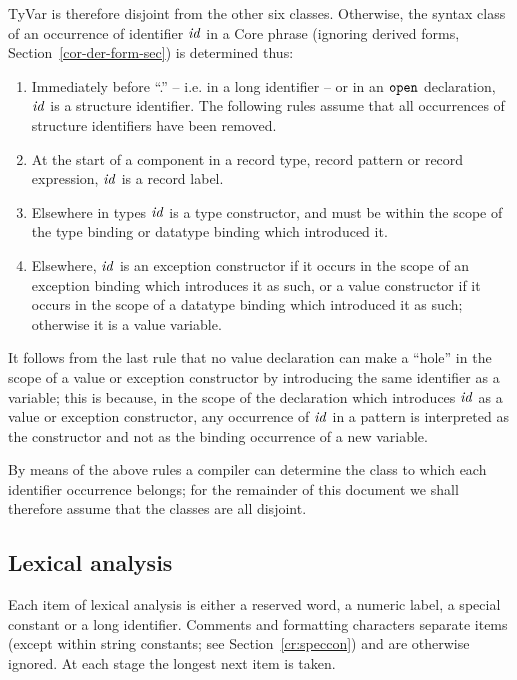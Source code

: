 TyVar is therefore disjoint
from the other six classes.   Otherwise, the syntax class of an occurrence of
identifier ${\it id}$ in a Core phrase (ignoring derived forms, 
Section~\ref{cor-der-form-sec}) is determined thus:
\begin{enumerate}
  \item Immediately before ``.'' -- i.e. in a long identifier -- or in an
        ${\tt open}$ declaration, ${\it id}$ is a structure
        identifier.  The following rules assume that all occurrences of
        structure identifiers have been removed.
  \item At the start of a component in a record type, record pattern or record
        expression,  ${\it id}$ is a record label.
  \item Elsewhere in types ${\it id}$ is a type constructor, and must be within the
        scope of the type binding or datatype binding which introduced it.
  \item Elsewhere, ${\it id}$ is an exception constructor if it occurs in
        the scope of an exception binding which introduces it as such, 
        or a value constructor if it occurs in the
        scope of a datatype binding which introduced it as such;
        otherwise it is a value variable.
\end{enumerate}
It follows from the last rule that no value declaration can make a
``hole'' in the scope of a value or exception constructor 
by introducing the same identifier as a variable; this
is because, in the scope of the declaration which introduces ${\it id}$ as a value
or exception constructor, any occurrence of ${\it id}$ in a pattern 
is interpreted as the
constructor and not as the binding occurrence of a new variable.

By means of the above rules a compiler can determine the class to which each
identifier occurrence belongs; for the remainder of this document we shall
therefore assume that the classes are all disjoint.

\subsection{Lexical analysis}
Each item of lexical analysis is either a reserved word, a numeric label, a
special constant or a long identifier.
Comments and formatting characters
separate items (except within string constants; see Section~\ref{cr:speccon})
and are otherwise
ignored.   At each stage the longest next item is taken.

